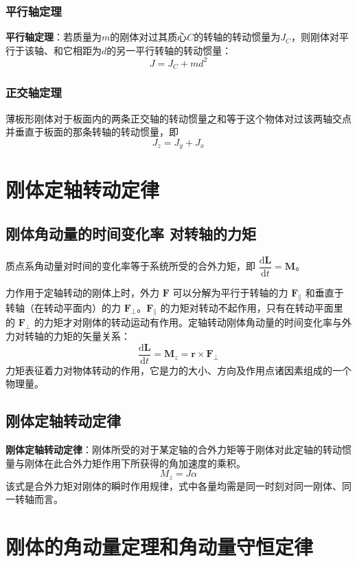     \subsubsection{平行轴定理}
    \textbf{平行轴定理}：若质量为$m$的刚体对过其质心$C$的转轴的转动惯量为$J_C$，则刚体对平行于该轴、和它相距为$d$的另一平行转轴的转动惯量：
    \[
    J = J_C + md^2
    \]

    \subsubsection{正交轴定理}
    薄板形刚体对于板面内的两条正交轴的转动惯量之和等于这个物体对过该两轴交点并垂直于板面的那条转轴的转动惯量，即
    \[
    J_z = J_y + J_x
    \]

\section{刚体定轴转动定律}
    \subsection{刚体角动量的时间变化率 对转轴的力矩}
    质点系角动量对时间的变化率等于系统所受的合外力矩，即 $\dfrac{\mathrm{d}\boldsymbol{L}}{\mathrm{d}t}=\boldsymbol{M}$。

    力作用于定轴转动的刚体上时，外力 $\boldsymbol{F}$ 可以分解为平行于转轴的力 $\boldsymbol{F}_\parallel$ 和垂直于转轴（在转动平面内）的力 $\boldsymbol{F}_\perp$。$\boldsymbol{F}_\parallel$ 的力矩对转动不起作用，只有在转动平面里的 $\boldsymbol{F}_\perp$ 的力矩才对刚体的转动运动有作用。定轴转动刚体角动量的时间变化率与外力对转轴的力矩的矢量关系：
    \[
    \frac{\mathrm{d}\boldsymbol{L}}{\mathrm{d}t}=\boldsymbol{M}_z=\boldsymbol{r}\times\boldsymbol{F}_\perp
    \]
    力矩表征着力对物体转动的作用，它是力的大小、方向及作用点诸因素组成的一个物理量。

    \subsection{刚体定轴转动定律}
    \textbf{刚体定轴转动定律}：刚体所受的对于某定轴的合外力矩等于刚体对此定轴的转动惯量与刚体在此合外力矩作用下所获得的角加速度的乘积。
    \[
    M_z = J \alpha
    \]
    该式是合外力矩对刚体的瞬时作用规律，式中各量均需是同一时刻对同一刚体、同一转轴而言。

\section{刚体的角动量定理和角动量守恒定律}
